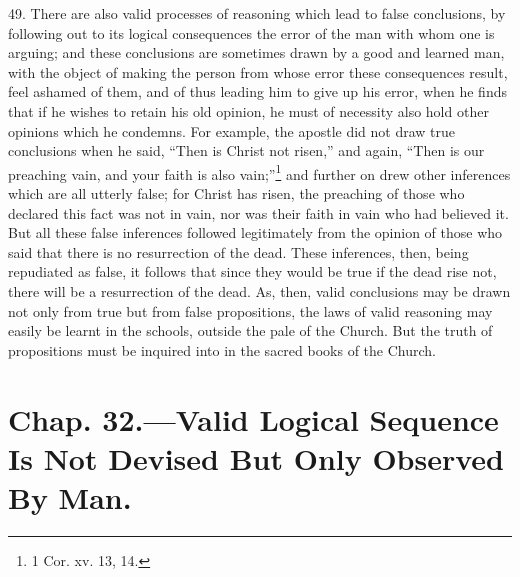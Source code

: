 49. There are also valid processes of reasoning which lead to false
conclusions, by following out to its logical consequences the error of
the man with whom one is arguing; and these conclusions are sometimes
drawn by a good and learned man, with the object of making the person
from whose error these consequences result, feel ashamed of them, and
of thus leading him to give up his error, when he finds that if he
wishes to retain his old opinion, he must of necessity also hold other
opinions which he condemns. For example, the apostle did not draw true
conclusions when he said, ``Then is Christ not risen,'' and again,
``Then is our preaching vain, and your faith is also
vain;''\footnote{1 Cor. xv. 13, 14.} and further on drew other
inferences which are all utterly false; for Christ has risen, the
preaching of those who declared this fact was not in vain, nor was
their faith in vain who had believed it. But all these false
inferences followed legitimately from the opinion of those who said
that there is no resurrection of the dead. These inferences, then,
being repudiated as false, it follows that since they would be true if
the dead rise not, there will be a resurrection of the dead. As, then,
valid conclusions may be drawn not only from true but from false
propositions, the laws of valid reasoning may easily be learnt in the
schools, outside the pale of the Church. But the truth of propositions
must be inquired into in the sacred books of the Church.

\section{Chap. 32.\smaller---Valid Logical Sequence Is Not Devised But
Only Observed By Man.}

